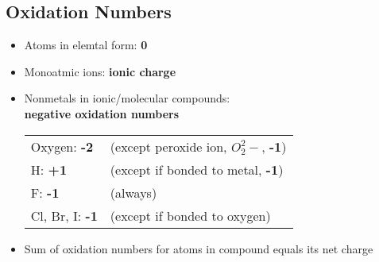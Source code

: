 \subsection{Oxidation Numbers}
    \begin{itemize}
        \itemsep0em
        \item Atoms in elemtal form: \textbf{0}
        \item Monoatmic ions: \textbf{ionic charge}
        \item Nonmetals in ionic/molecular compounds:\\ \textbf{negative oxidation numbers}\\
            \begin{tabular}{l l}
                Oxygen: \textbf{-2} & (except peroxide ion, $O_2^2-$, \textbf{-1})\\
                H: \textbf{+1} & (except if bonded to metal, \textbf{-1})\\
                F: \textbf{-1} & (always)\\
                Cl, Br, I: \textbf{-1} & (except if bonded to oxygen)
            \end{tabular}
        \item Sum of oxidation numbers for atoms in compound equals its net charge
    \end{itemize}